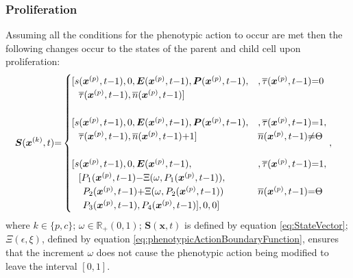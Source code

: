 \documentclass[\main/thesis.tex]{subfiles}
\begin{document}
\subsubsection{Proliferation}
Assuming all the conditions for the phenotypic action to occur are met then 
the following changes occur to the states of the parent and child cell upon proliferation:
\begin{align}
&\boldsymbol{S}(\boldsymbol{x}^{(k)}, t) {=} \begin{cases}
                     [ s(\boldsymbol{x}^{(p)}, t{-}1), 0, 
                       \boldsymbol{E}(\boldsymbol{x}^{(p)}, t{-}1),
                       \boldsymbol{P}(\boldsymbol{x}^{(p)}, t{-}1),
                       & ,\overline{\tau}(\boldsymbol{x}^{(p)}, t{-}1) {=} 0 \\
                     \hspace{0.25cm} \overline{\tau}(\boldsymbol{x}^{(p)}, t{-}1), 
                     \overline{n}(\boldsymbol{x}^{(p)}, t{-}1) ] \\
                     \\
                     [ s(\boldsymbol{x}^{(p)}, t{-}1), 0,
                        \boldsymbol{E}(\boldsymbol{x}^{(p)}, t{-}1),
                        \boldsymbol{P}(\boldsymbol{x}^{(p)}, t{-}1),
                       & ,\overline{\tau}(\boldsymbol{x}^{(p)}, t{-}1) {=} 1, \\
                       \hspace{0.25cm} \overline{\tau}(\boldsymbol{x}^{(p)}, t{-}1),
                       \overline{n}(\boldsymbol{x}^{(p)}, t{-}1){+}1 ]
                       & \overline{n}(\boldsymbol{x}^{(p)}, t{-}1) {\ne} \Theta \\
                     \\
                     [ s(\boldsymbol{x}^{(p)}, t{-}1), 0,
                        \boldsymbol{E}(\boldsymbol{x}^{(p)}, t{-}1),
                       & , \overline{\tau}(\boldsymbol{x}^{(p)}, t{-}1) {=} 1, \\
                     \hspace{0.25cm} [ P_1(\boldsymbol{x}^{(p)}, t{-}1) {-} \Xi(\omega, P_1(\boldsymbol{x}^{(p)}, t{-}1)),\\
                     \hspace{0.4cm}  P_2(\boldsymbol{x}^{(p)}, t{-}1) {+} \Xi(\omega, P_2(\boldsymbol{x}^{(p)}, t{-}1))
                       & \overline{n}(\boldsymbol{x}^{(p)}, t{-}1) {=} \Theta \\
                       \hspace{0.4cm} P_3(\boldsymbol{x}^{(p)}, t{-}1), 
                       P_4(\boldsymbol{x}^{(p)}, t{-}1) ], 0, 0 ]
                    \end{cases}, \label{eq:ProliferationStateChange}
\end{align}
where $k {\in} \{ p, c \}$; $\omega {\in} \mathbb{R}_+(0, 1)$; $\boldsymbol{S}(\boldsymbol{x}, t)$ is defined by equation \eqref{eq:StateVector}; $\Xi(\epsilon, \xi)$, defined by equation \eqref{eq:phenotypicActionBoundaryFunction}, ensures that the increment $\omega$ does not cause the phenotypic action being modified to leave the interval $[0, 1]$.
\end{document}
